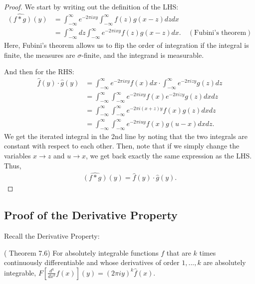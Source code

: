 \documentclass[11pt]{article}
\begin{document}
\begin{proof}
    We start by writing out the definition of the LHS:
    \begin{align}
        \widehat{(f*g)}(y) &= \int_{-\infty}^\infty e^{-2\pi i x y} \int_{-\infty}^\infty f(z) g(x-z) dz dx\\
        &= \int_{-\infty}^\infty dz \int_{-\infty}^\infty e^{-2\pi i xy}f(z) g(x-z) dx. \quad(\text{Fubini's theorem})
    \end{align}
    Here, Fubini's theorem \cite{Fubini} allows us to flip the order of integration if the integral is finite, the measures are $\sigma$-finite, and the integrand is measurable.

    
    And then for the RHS:
    \begin{align}
        \hat{f}(y) \cdot \hat{g}(y) &= \int_{-\infty}^\infty e^{-2\pi i xy} f(x) dx \cdot \int_{-\infty}^\infty e^{-2\pi i zy} g(z) dz\\
        &= \int_{-\infty}^\infty \int_{-\infty}^\infty e^{-2\pi i xy} f(x)e^{-2\pi i zy} g(z) dx dz\\
        &= \int_{-\infty}^\infty \int_{-\infty}^\infty e^{-2\pi i (x+z)y} f(x)g(z) dx dz\\
        &=\int_{-\infty}^\infty \int_{-\infty}^\infty e^{-2\pi i uy} f(x) g(u-x) dx dz.
    \end{align}
    We get the iterated integral in the 2nd line by noting that the two integrals are constant with respect to each other. Then, note that if we simply change the variables $x \rightarrow z$ and $u \rightarrow x$, we get back exactly the same expression as the LHS. Thus,
\begin{align}
    \widehat{(f*g)}(y) = \hat{f}(y) \cdot \hat{g}(y).
\end{align}
\end{proof}

\subsection{Proof of the Derivative Property}

Recall the Derivative Property:
\begin{theorem} \label{thm:funcFourierDerivAppendix} (\cite{vanDijk+2013} Theorem 7.6)
For absolutely integrable functions $f$ that are $k$ times continuously differentiable and whose derivatives of order ${1,...,k}$ are absolutely integrable, $F\left[\frac{d^k}{dx^k} f(x)\right](y) = (2 \pi i y)^k \hat{f}(x)$.
\end{theorem}
\end{document}
